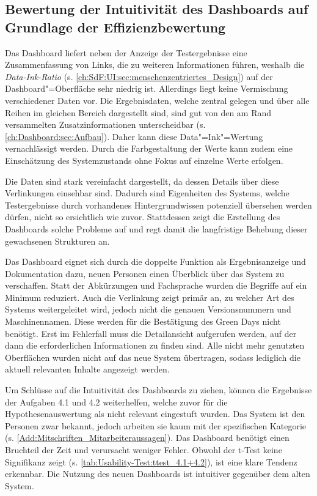 \subsection{Bewertung der Intuitivität des Dashboards auf Grundlage der Effizienzbewertung}
\label{ch:Ergebnisse:Intuitivität}

Das Dash\-board liefert neben der Anzeige der Testergebnisse eine Zusammenfassung von Links, die zu weiteren Informationen führen, weshalb die \textit{Data-Ink-Ratio} (s. \autoref{ch:SdF:UI:sec:menschenzentriertes_Design}) auf der Dash\-board"=Oberfläche sehr niedrig ist. Allerdings liegt keine Vermischung verschiedener Daten vor. Die Ergebnisdaten, welche zentral gelegen und über alle Reihen im gleichen Bereich dargestellt sind, sind gut von den am Rand versammelten Zusatzinformationen unterscheidbar (s. \autoref{ch:Dashboard:sec:Aufbau}). Daher kann diese Data"=Ink"=Wertung 
vernachlässigt werden. Durch die Farbgestaltung der Werte kann zudem eine Einschätzung des Systemzustands ohne Fokus auf einzelne Werte erfolgen.

Die Daten sind stark vereinfacht dargestellt, da dessen Details über diese Verlinkungen einsehbar sind. Dadurch sind Eigenheiten des Systems, welche Testergebnisse durch vorhandenes Hintergrundwissen potenziell übersehen werden dürfen, nicht so ersichtlich wie zuvor. Stattdessen zeigt die Erstellung des Dash\-boards solche Probleme auf und regt damit die langfristige Behebung dieser gewachsenen Strukturen an.

Das Dash\-board eignet sich durch die doppelte Funktion als Ergebnisanzeige und Dokumentation dazu, neuen Personen einen Überblick über das System zu verschaffen. Statt der Abkürzungen und Fachsprache wurden die Begriffe auf ein Minimum reduziert. Auch die Verlinkung zeigt primär an, zu welcher Art des Systems weitergeleitet wird, jedoch nicht die genauen Versionsnummern und Maschinennamen. Diese werden für die Bestätigung des Green Days nicht benötigt. Erst im Fehlerfall muss die Detailansicht aufgerufen werden, auf der dann die erforderlichen Informationen zu finden sind. Alle nicht mehr genutzten Oberflächen wurden nicht auf das neue System übertragen, sodass lediglich die aktuell relevanten Inhalte angezeigt werden.

Um Schlüsse auf die Intuitivität des Dash\-boards zu ziehen, können die Ergebnisse der Aufgaben 4.1 und 4.2 weiterhelfen, welche zuvor für die Hypothesenauswertung als nicht relevant eingestuft wurden.
Das System ist den Personen zwar bekannt, jedoch arbeiten sie kaum mit der spezifischen Kategorie (s. \autoref{Add:Mitschriften_Mitarbeiteraussagen}). Das Dash\-board benötigt einen Bruchteil der Zeit und verursacht weniger Fehler. Obwohl der t-Test keine Signifikanz zeigt (s. \autoref{tab:Usability-Test:ttest_4.1+4.2}), ist eine klare Tendenz erkennbar. Die Nutzung des neuen Dashboards ist intuitiver gegenüber dem alten System.

